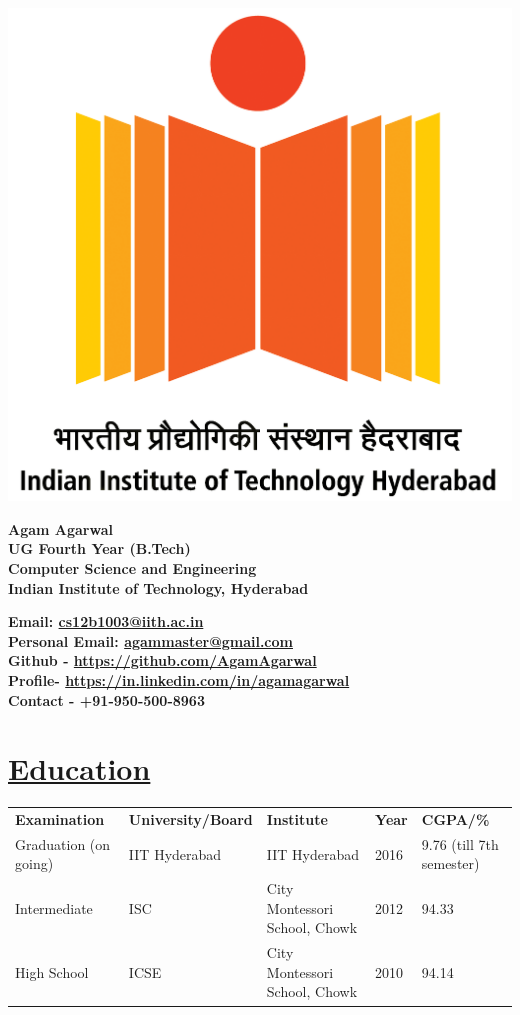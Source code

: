 \documentclass[8pt]{extarticle}
\newcommand{\heading}[1]{
\section*{\color{red}\underline{#1}}
}
\begin{document}
\begin{table}[ht]
\begin{minipage}{0.2\linewidth}
\includegraphics[width=0.8\linewidth]{iith}
\end{minipage}
\begin{minipage}{0.4\linewidth}
\begin{flushleft}
\textbf{Agam Agarwal \\
UG Fourth Year (B.Tech) \\
Computer Science and Engineering \\
Indian Institute of Technology, Hyderabad}
\end{flushleft}
\end{minipage}
\hspace{0.5cm}
\begin{minipage}{0.4\linewidth}
\begin{flushleft}
\textbf{Email: \href{mailto:cs12b1003@iith.ac.in}{cs12b1003@iith.ac.in} \\
Personal Email: \href{mailto:agammaster@gmail.com}{agammaster@gmail.com} \\
Github - \url{https://github.com/AgamAgarwal} \\
Profile- \url{https://in.linkedin.com/in/agamagarwal} \\
Contact - +91-950-500-8963}
\end{flushleft}
\end{minipage}
\end{table}

\heading{Education}

\begin{tabular}{lllll}
\textbf{Examination} & \textbf{University/Board} & \textbf{Institute} & \textbf{Year} & \textbf{CGPA/\%} \\
Graduation (on going) & IIT Hyderabad & IIT Hyderabad & 2016 & 9.76 (till 7th semester) \\
Intermediate & ISC & City Montessori School, Chowk & 2012 & 94.33 \\
High School & ICSE & City Montessori School, Chowk & 2010 & 94.14
\end{tabular}
\end{document}
